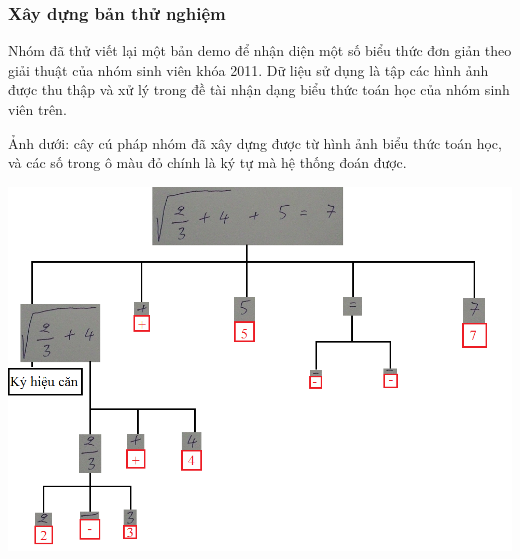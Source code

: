 \documentclass[a4paper,12pt]{article}
\begin{document}
	\subsubsection{Xây dựng bản thử nghiệm}
	
	Nhóm đã thử viết lại một bản demo để nhận diện một số biểu thức đơn giản theo giải thuật của nhóm sinh viên khóa 2011. Dữ liệu sử dụng là tập các hình ảnh được thu thập và xử lý trong đề tài nhận dạng biểu thức toán học của nhóm sinh viên trên.
	
	Ảnh dưới: cây cú pháp nhóm đã xây dựng được từ hình ảnh biểu thức toán học, và các số trong ô màu đỏ chính là ký tự mà hệ thống đoán được.\par
	
	\begin{center}
		
		\centering
		\includegraphics[width=0.8\linewidth]{kq_1_1.png}
		\vspace{0.5cm}
	\end{center}
	
\end{document}
